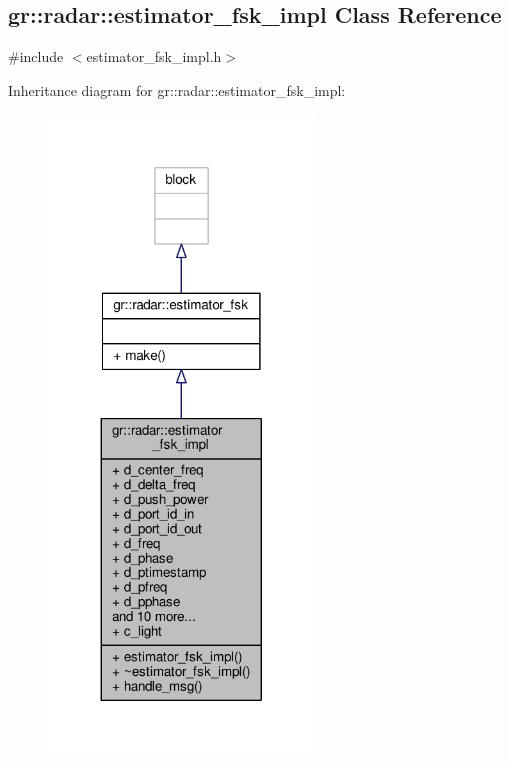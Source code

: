 \subsection{gr\+:\+:radar\+:\+:estimator\+\_\+fsk\+\_\+impl Class Reference}
\label{classgr_1_1radar_1_1estimator__fsk__impl}


{\ttfamily \#include $<$estimator\+\_\+fsk\+\_\+impl.\+h$>$}



Inheritance diagram for gr\+:\+:radar\+:\+:estimator\+\_\+fsk\+\_\+impl\+:
\nopagebreak
\begin{figure}[H]
\begin{center}
\leavevmode
\includegraphics[width=200pt]{db/daf/classgr_1_1radar_1_1estimator__fsk__impl__inherit__graph}
\end{center}
\end{figure}


